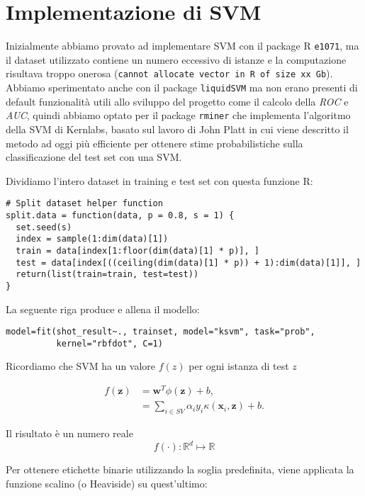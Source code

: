 \section{Implementazione di SVM}

Inizialmente abbiamo provato ad implementare SVM con il package R \texttt{e1071}, ma il dataset utilizzato contiene un numero eccessivo di istanze e la computazione risultava troppo onerosa (\texttt{cannot allocate vector in R of size xx Gb}). Abbiamo sperimentato anche con il package \texttt{liquidSVM} ma non erano presenti di default funzionalità utili allo sviluppo del progetto come il calcolo della \textit{ROC} e \textit{AUC}, quindi abbiamo optato per il package \texttt{rminer} che implementa l'algoritmo della SVM di Kernlabs, basato sul lavoro di John Platt \cite{Platt99probabilisticoutputs} in cui viene descritto il metodo ad oggi più efficiente per ottenere stime probabilistiche sulla classificazione del test set con una SVM.

Dividiamo l'intero dataset in training e test set con questa funzione R:

\begin{verbatim}
# Split dataset helper function
split.data = function(data, p = 0.8, s = 1) {
  set.seed(s)
  index = sample(1:dim(data)[1])
  train = data[index[1:floor(dim(data)[1] * p)], ]
  test = data[index[((ceiling(dim(data)[1] * p)) + 1):dim(data)[1]], ]
  return(list(train=train, test=test))
}
\end{verbatim}

La seguente riga produce e allena il modello:

\begin{verbatim}
model=fit(shot_result~., trainset, model="ksvm", task="prob", 
          kernel="rbfdot", C=1)
\end{verbatim}

Ricordiamo che SVM ha un valore $ f(z) $ per ogni istanza di test $z$

\begin{align}
f(\mathbf{z}) &= \mathbf{w}^T\phi(\mathbf{z}) + b, \\
&= \sum_{i\in SV} \alpha_i y_i \kappa(\mathbf{x}_i,\mathbf{z}) + b.
\end{align}

Il risultato è un numero reale 
$$f(\cdot):\mathbb{R}^d \mapsto \mathbb{R}$$

Per ottenere etichette binarie utilizzando la soglia predefinita, viene applicata la funzione scalino (o Heaviside) su quest'ultimo:

